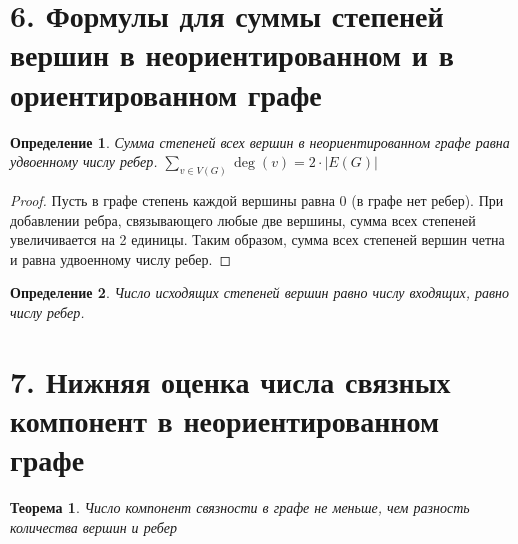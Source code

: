 \documentclass[a4paper,12pt]{article}
\newtheorem*{defin}{Определение}
\newtheorem*{ther}{Теорема}
\begin{document}
    \section*{6. Формулы для суммы степеней вершин в неориентированном и в ориентированном графе}

    \begin{defin}
        Сумма степеней всех вершин в неориентированном графе равна удвоенному числу ребер. $\displaystyle\sum_{v \in V(G)} \deg(v) = 2 \cdot |E(G)|$
    \end{defin}
    \begin{proof}
        Пусть в графе степень каждой вершины равна $0$ (в графе нет ребер). При добавлении ребра, связывающего любые две вершины, сумма всех степеней увеличивается на 2 единицы. Таким образом, сумма всех степеней вершин четна и равна удвоенному числу ребер.
    \end{proof}
    \begin{defin}
        Число исходящих степеней вершин равно числу входящих, равно числу ребер.
    \end{defin}

    \section*{7. Нижняя оценка числа связных компонент в неориентированном графе}
    
    \begin{ther}
        Число компонент связности в графе не меньше, чем разность количества вершин и ребер
    \end{ther}
    
\end{document}
